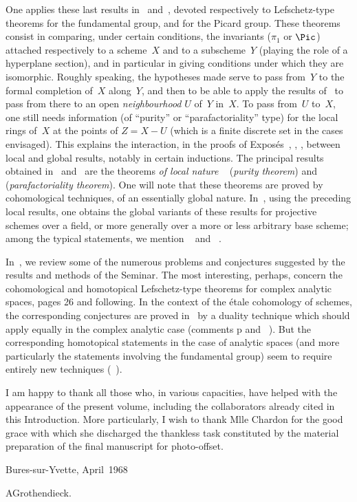 One applies these last results in~ and~, devoted
respectively to Lefschetz-type theorems for the fundamental group, and
for the Picard group. These theorems consist in comparing, under certain
conditions, the invariants ($\pi_1$ or $\Pic$) attached respectively to
a scheme~$X$ and to a subscheme~$Y$ (playing the role of a hyperplane
section), and in particular in giving conditions under which they are
isomorphic. Roughly speaking, the hypotheses made serve to pass from~$Y$
to the formal completion of~$X$ along~$Y$, and then to be able to apply
the results of~ to pass from there to an open \emph{neighbourhood}
$U$ of~$Y$ in~$X$. To pass from~$U$ to~$X$, one still needs information
(of ``purity'' or ``parafactoriality'' type) for the local rings of~$X$
at the points of $Z=X-U$ (which is a finite discrete set in the cases
envisaged). This explains the interaction, in the proofs of
Expos\'es~, , , between local and global
results, notably in certain inductions. The principal results obtained
in~ and~ are the theorems \emph{of local nature}
~ (\emph{purity theorem}) and
~ (\emph{parafactoriality theorem}). One will note
that these theorems are proved by cohomological techniques, of an
essentially global nature. In~, using the preceding local
results, one obtains the global variants of these results for projective
schemes over a field, or more generally over a more or less arbitrary
base scheme; among the typical statements, we mention
~ and ~.

In~, we review some of the numerous problems and conjectures
suggested by the results and methods of the Seminar. The most
interesting, perhaps, concern the cohomological and homotopical
Lefschetz-type theorems for complex analytic spaces, \cf {}
pages 26 and following. In the context of the \'etale
cohomology of schemes, the corresponding conjectures are proved
in~ by a duality technique which should apply equally in the
complex analytic case (\cf comments  p and
~). But the corresponding homotopical statements
in the case of analytic spaces (and more particularly the statements
involving the fundamental group) seem to require entirely new techniques
(\cf {}~).

I am happy to thank all those who, in various capacities, have helped
with the appearance of the present volume, including the collaborators
already cited in this Introduction. More particularly, I wish to thank
Mlle Chardon for the good grace with which she discharged the thankless
task constituted by the material preparation of the final manuscript for
photo-offset.

\bigskip\hfill Bures-sur-Yvette, April~1968
\par\smallskip \hfill A\ptbl Grothendieck.
